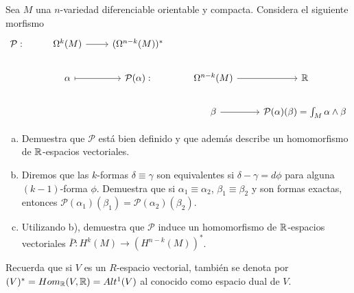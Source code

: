 \documentclass[twoside]{article}
\begin{document}
\begin{ejercicio}{4}
Sea $M$ una $n$-variedad diferenciable orientable y compacta. Considera el siguiente morfismo
\[
\begin{tikzcd}
\mathcal{P}: & \Omega^k(M)\arrow[r]    & (\Omega^{n-k}(M))^*  &                  & \\
             & \alpha\arrow[r, mapsto] & \mathcal{P}(\alpha): & \Omega^{n-k}(M)\arrow[r]  & \R\\
             &		                   &					  &  \beta\arrow[r]  &\mathcal{P}(\alpha)(\beta)=\int_M \alpha\land\beta
\end{tikzcd}
\]
\begin{enumerate}[a)]
\item Demuestra que $\mathcal{P}$ está bien definido y que además describe un homomorfismo de $\mathbb{R}$-espacios vectoriales.
\item Diremos que las $k$-formas $\delta\equiv\gamma$ son equivalentes si $\delta-\gamma=d\phi$ para alguna $(k-1)$-forma $\phi$. Demuestra que si $\alpha_1\equiv \alpha_2$, $\beta_1\equiv\beta_2$ y son formas exactas, entonces $\mathcal{P}(\alpha_1)(\beta_1)=\mathcal{P}(\alpha_2)(\beta_2)$. 
\item Utilizando b), demuestra que $\mathcal{P}$ induce un homomorfismo de $\mathbb{R}$-espacios vectoriales $\overline{P}:H^k(M)\to (H^{n-k}(M))^*$.
\end{enumerate}
\begin{nota}
Recuerda que si $V$ es un $R$-espacio vectorial, también se denota por $(V)^*=Hom_{\mathbb{R}}(V,\mathbb{R})=Alt^1(V)$ al conocido como espacio dual de $V$.
\end{nota}
\end{ejercicio}
\end{document}
